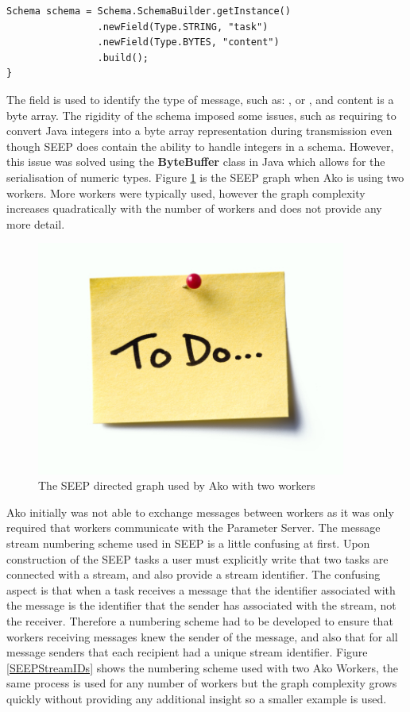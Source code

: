 \documentclass[12pt]{article}
\begin{document}
\begin{lstlisting}[caption={The SEEP schema used for Ako},label=AkoSchema]
Schema schema = Schema.SchemaBuilder.getInstance()
                .newField(Type.STRING, "task")
                .newField(Type.BYTES, "content")
                .build();
}
\end{lstlisting}

The  field is used to identify the type of message, such as: , or , and content is a byte array. The rigidity of the schema imposed some issues, such as requiring to convert Java integers into a byte array representation during transmission even though SEEP does contain the ability to handle integers in a schema. However, this issue was solved using the \textbf{ByteBuffer} class in Java which allows for the serialisation of numeric types.
\newline
\newline
Figure \ref{AkoGraph} is the SEEP graph when Ako is using two workers. More workers were typically used, however the graph complexity increases quadratically with the number of workers and does not provide any more detail.

\begin{figure}[H]
  \centering
  \includegraphics[width=4in]{todo}
  \caption[]{The SEEP directed graph used by Ako with two workers}
  \label{AkoGraph}
\end{figure}

Ako initially was not able to exchange messages between workers as it was only required that workers communicate with the Parameter Server. The message stream numbering scheme used in SEEP is a little confusing at first. Upon construction of the SEEP tasks a user must explicitly write that two tasks are connected with a stream, and also provide a stream identifier. The confusing aspect is that when a task receives a message that the identifier associated with the message is the identifier that the sender has associated with the stream, not the receiver. Therefore a numbering scheme had to be developed to ensure that workers receiving messages knew the sender of the message, and also that for all message senders that each recipient had a unique stream identifier. Figure \ref{SEEPStreamIDs} shows the numbering scheme used with two Ako Workers, the same process is used for any number of workers but the graph complexity grows quickly without providing any additional insight so a smaller example is used.
\end{document}
